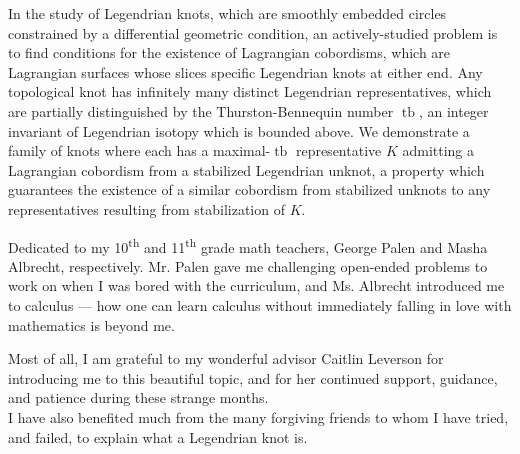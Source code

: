 \documentclass[11pt,twoside,reqno]{book}
\DeclareMathOperator{\tb}{tb}
\begin{document}

\abstr

In the study of Legendrian knots, which are smoothly embedded circles constrained by a differential geometric condition, an actively-studied problem is to find conditions for the existence of Lagrangian cobordisms, which are Lagrangian surfaces whose slices specific Legendrian knots at either end.
Any topological knot has infinitely many distinct Legendrian representatives, which are partially distinguished by the Thurston-Bennequin number $\tb$, an integer invariant of Legendrian isotopy which is bounded above.
We demonstrate a family of knots where each has a maximal-$\tb$ representative $K$ admitting a Lagrangian cobordism from a stabilized Legendrian unknot, a property which guarantees the existence of a similar cobordism from stabilized unknots to any representatives resulting from stabilization of $K$.

\dedic

Dedicated to my 10\textsuperscript{th} and 11\textsuperscript{th} grade math teachers, George Palen and Masha Albrecht, respectively. Mr. Palen gave me challenging open-ended problems to work on when I was bored with the curriculum, and Ms. Albrecht introduced me to calculus --- how one can learn calculus without immediately falling in love with mathematics is beyond me. 

\acknowl

Most of all, I am grateful to my wonderful advisor Caitlin Leverson for introducing me to this beautiful topic, and for her continued support, guidance, and patience during these strange months.\\
I have also benefited much from the many forgiving friends to whom I have tried, and failed, to explain what a Legendrian knot is.

\tableofcontents

\startmain









\begin{appendices}

    

\end{appendices}

\printbibliography[heading=bibintoc]
\end{document}
